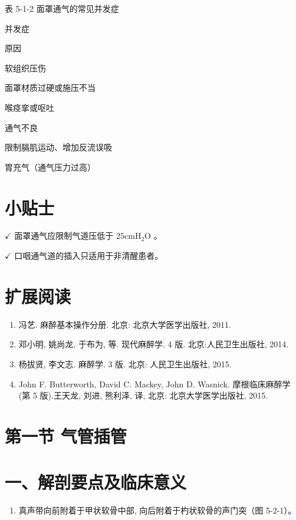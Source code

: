 \documentclass[10pt]{article}
\begin{document}
表 5-1-2 面罩通气的常见并发症

并发症

原因

软组织压伤

面罩材质过硬或施压不当

喉痉挛或呕吐

通气不良

限制膈肌运动、增加反流误吸

胃充气（通气压力过高）

\section*{小贴士}
$\checkmark$ 面罩通气应限制气道压低于 $25 \mathrm{cmH}_{2} \mathrm{O}$ 。

$\checkmark$ 口咽通气道的插入只适用于非清醒患者。

\section*{扩展阅读}
\begin{enumerate}
  \item 冯艺. 麻醉基本操作分册. 北京: 北京大学医学出版社, 2011.

  \item 邓小明, 姚尚龙, 于布为, 等. 现代麻醉学. 4 版. 北京:人民卫生出版社, 2014.

  \item 杨拔贤, 李文志. 麻醉学. 3 版. 北京: 人民卫生出版社, 2015.

  \item John F. Butterworth, David C. Mackey, John D. Wasnick. 摩根临床麻醉学 (第 5 版).王天龙, 刘进, 熊利泽, 译, 北京: 北京大学医学出版社, 2015.

\end{enumerate}

\section*{第一节 气管插管}
\section*{一、解剖要点及临床意义}
\begin{enumerate}
  \item 真声带向前附着于甲状软骨中部, 向后附着于杓状软骨的声门突（图 5-2-1）。
\end{enumerate}
\end{document}
